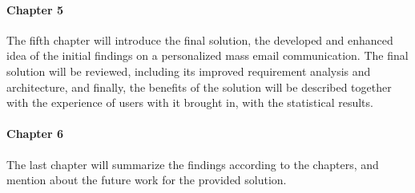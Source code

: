 \paragraph{Chapter 5} The fifth chapter will introduce the final solution, the developed and enhanced idea of the initial findings on a personalized mass email communication. The final solution will be reviewed, including its improved requirement analysis and architecture, and finally, the benefits of the solution will be described together with the experience of users with it brought in, with the statistical results.

\paragraph{Chapter 6} The last chapter will summarize the findings according to the chapters, and mention about the future work for the provided solution.

